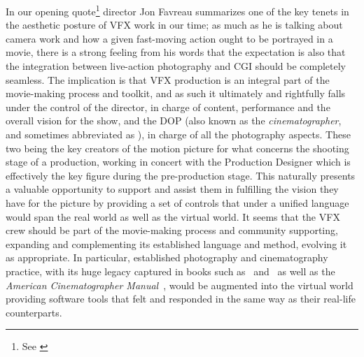 In our opening quote\footnote{See \cite{duncan08}} director Jon Favreau summarizes one of the key 
tenets in the aesthetic posture of \gls{VFX} work in our time; as much as he is talking
about camera work and how a given fast-moving action ought to be portrayed in a movie, 
there is a strong feeling from his words that the expectation is also that the integration between 
live-action photography and \gls{CGI} should be completely seamless.
The implication is that \gls{VFX} production is an integral part of the movie-making process and toolkit, 
and as such it ultimately and rightfully falls under the control of the director, in charge of content, 
performance and the overall vision for the show, and the \gls{DOP} (also known as 
the \textsl{cinematographer}, and sometimes abbreviated as ), in charge of all the photography aspects. 
These two being the key creators of the motion picture for what concerns the shooting stage of a production,
working in concert with the Production Designer which is effectively the key figure during the
pre-production stage. 
This naturally presents a valuable opportunity to support and assist them in fulfilling the vision
they have for the picture by providing a set of controls that under a unified language would span the 
real world as well as the \gls{virtual} world.
It seems that the \gls{VFX} crew should be part of the movie-making process and community supporting,
expanding and complementing its established language and method, evolving it as appropriate.
In particular, established photography and cinematography practice, with its huge 
legacy captured in books such as~\cite{alton1995} and~\cite{lowell1992} as well as
the \emph{American Cinematographer Manual}~\cite{burum2007}, would be augmented into the \gls{virtual} world
providing software tools that felt and responded in the same way as their real-life counterparts.

